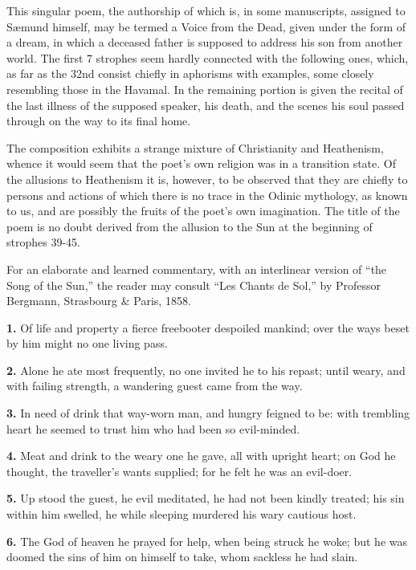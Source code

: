 
This singular poem, the authorship of which is, in some manuscripts,
assigned to Sæmund himself, may be termed a Voice from the Dead, given
under the form of a dream, in which a deceased father is supposed to
address his son from another world. The first 7 strophes seem hardly
connected with the following ones, which, as far as the 32nd consist
chiefly in aphorisms with examples, some closely resembling those in
the Havamal. In the remaining portion is given the recital of the last
illness of the supposed speaker, his death, and the scenes his soul
passed through on the way to its final home.

The composition exhibits a strange mixture of Christianity and
Heathenism, whence it would seem that the poet's own religion was in a
transition state. Of the allusions to Heathenism it is, however, to be
observed that they are chiefly to persons and actions of which there
is no trace in the Odinic mythology, as known to us, and are possibly
the fruits of the poet's own imagination. The title of the poem is no
doubt derived from the allusion to the Sun at the beginning of
strophes 39-45.

For an elaborate and learned commentary, with an interlinear version
of ``the Song of the Sun,'' the reader may consult ``Les Chants de Sol,''
by Professor Bergmann, Strasbourg \& Paris, 1858.

\textbf{1.} Of life and property a fierce freebooter despoiled mankind; over
the ways beset by him might no one living pass.

\textbf{2.} Alone he ate most frequently, no one invited he to his repast;
until weary, and with failing strength, a wandering guest came from
the way.

\textbf{3.} In need of drink that way-worn man, and hungry feigned to be:
with trembling heart he seemed to trust him who had been so
evil-minded.

\textbf{4.} Meat and drink to the weary one he gave, all with upright heart;
on God he thought, the traveller's wants supplied; for he felt he was
an evil-doer.

\textbf{5.} Up stood the guest, he evil meditated, he had not been kindly
treated; his sin within him swelled, he while sleeping murdered his
wary cautious host.

\textbf{6.} The God of heaven he prayed for help, when being struck he woke;
but he was doomed the sins of him on himself to take, whom sackless he
had slain.

